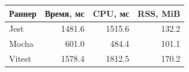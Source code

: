 \begin{tabular}{lrrr}\toprule Раннер & Время, мс & CPU, мс & RSS, MiB\\\midrule
Jest & 1481.6 & 1515.6 & 132.2\\
Mocha & 601.0 & 484.4 & 101.1\\
Vitest & 1578.4 & 1812.5 & 170.2\\
\bottomrule\end{tabular}

